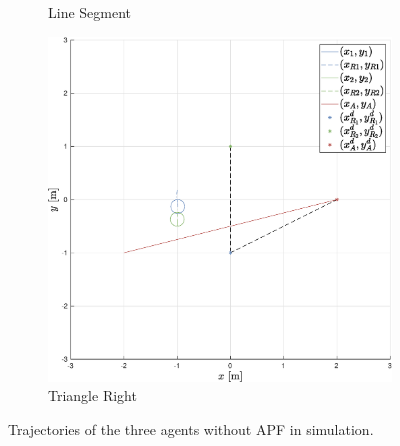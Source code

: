 \documentclass{ifacconf}
\begin{document}
\begin{figure}
\begin{subfigure}[b]{0.32\columnwidth}
        \caption{Line Segment}
    \end{subfigure}
    \begin{subfigure}[b]{0.32\columnwidth}
        \centering
        \includegraphics[width=\linewidth]{images/simulations/wo_APF/3rd_scenario_wo.eps}
        \caption{Triangle Right}
    \end{subfigure}
    \vspace{-0.2cm}
    \caption{Trajectories of the three agents without APF in simulation.}
\end{figure}
\end{document}
